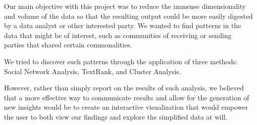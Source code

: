 Our main objective with this project was to reduce the immense dimensionality and volume of the data so that the resulting output could be more easily digested by a data analyst or other interested party. We wanted to find patterns in the data that might be of interest, such as communities of receiving or sending parties that shared certain commonalities. 

We tried to discover such patterns through the application of three methods: Social Network Analysis, TextRank, and Cluster Analysis.

However, rather than simply report on the results of such analysis, we believed that a more effective way to communicate results and allow for the generation of new insights would be to create an interactive visualization that would empower the user to both view our findings and explore the simplified data at will.
